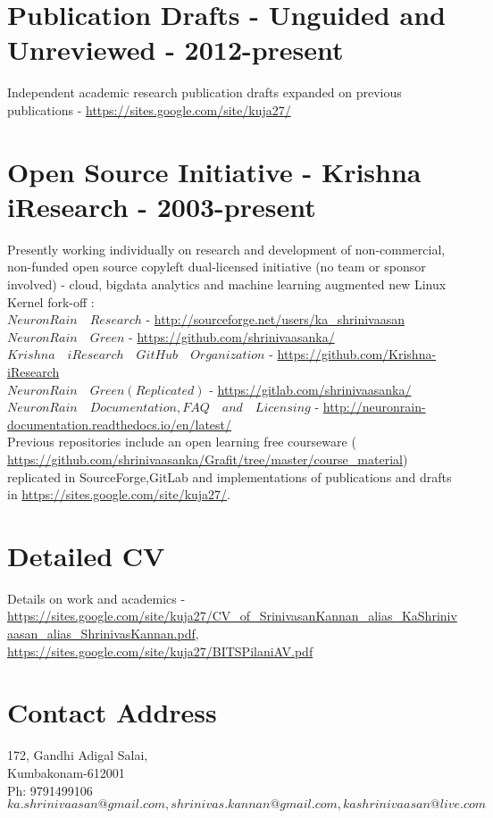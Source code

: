 \documentclass[11pt,onecolumn]{article}
\begin{document}
\section{Publication Drafts - Unguided and Unreviewed - 2012-present}
Independent academic research publication drafts expanded on previous publications - \url {https://sites.google.com/site/kuja27/}

\section{Open Source Initiative - Krishna iResearch - 2003-present}
Presently working individually on research and development of non-commercial, non-funded open source copyleft dual-licensed initiative (no team or sponsor involved) - cloud, bigdata analytics and machine learning augmented new Linux Kernel fork-off $:$ \\
 $NeuronRain \quad Research$ - \url {http://sourceforge.net/users/ka_shrinivaasan} \\
 $NeuronRain \quad Green$ - \url {https://github.com/shrinivaasanka/} \\
 $Krishna \quad iResearch \quad GitHub \quad Organization$ - \url {https://github.com/Krishna-iResearch} \\
  $NeuronRain \quad Green (Replicated)$ - \url {https://gitlab.com/shrinivaasanka/} \\
 $NeuronRain \quad Documentation, FAQ \quad and \quad Licensing$ - \url {http://neuronrain-documentation.readthedocs.io/en/latest/} \\
Previous repositories include an open learning free courseware ( \url {https://github.com/shrinivaasanka/Grafit/tree/master/course_material})  replicated in SourceForge,GitLab and implementations of publications and drafts in \url {https://sites.google.com/site/kuja27/}.

\section{Detailed CV}
Details on work and academics - \url {https://sites.google.com/site/kuja27/CV\_of\_SrinivasanKannan\_alias\_KaShrinivaasan\_alias\_ShrinivasKannan.pdf}, \url {https://sites.google.com/site/kuja27/BITSPilaniAV.pdf}

\section{Contact Address}
172, Gandhi Adigal Salai, \\
Kumbakonam-612001 \\
Ph: 9791499106 \\
$ka.shrinivaasan@gmail.com, shrinivas.kannan@gmail.com, kashrinivaasan@live.com$ 
\end{document}
